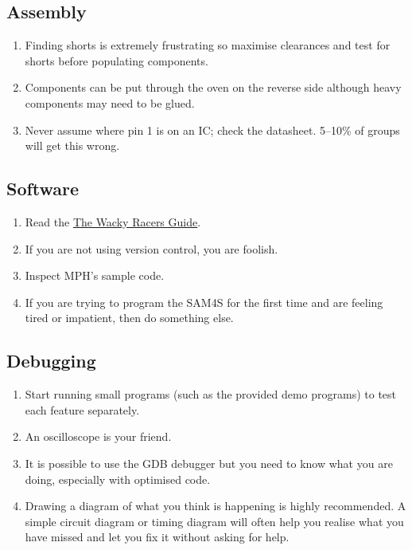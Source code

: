 \documentclass[11pt, a4paper]{article}
\newcommand{\theguide}{\href{https://eng-git.canterbury.ac.nz/wacky-racers/wacky-racers/-/blob/master/doc/guide/guide.pdf}{The Wacky Racers Guide}}
\begin{document}
\subsection{Assembly}

\begin{enumerate}
\item Finding shorts is extremely frustrating so maximise clearances
  and test for shorts before populating components.

\item Components can be put through the oven on the reverse side
  although heavy components may need to be glued.

\item Never assume where pin 1 is on an IC; check the datasheet.
  5--10\% of groups will get this wrong.

\end{enumerate}


\subsection{Software}

\begin{enumerate}
\item Read the \theguide.

\item If you are not using version control, you are foolish.

\item Inspect MPH's sample code.

\item If you are trying to program the SAM4S for the first time and
  are feeling tired or impatient, then do something else.
\end{enumerate}


\subsection{Debugging}

\begin{enumerate}
\item Start running small programs (such as the provided demo
  programs) to test each feature separately.

\item An oscilloscope is your friend.

\item It is possible to use the GDB debugger but you need to know what
  you are doing, especially with optimised code.

\item Drawing a diagram of what you think is happening is highly recommended. A
simple circuit diagram or timing diagram will often help you realise what you
have missed and let you fix it without asking for help.

\end{enumerate}
\end{document}
